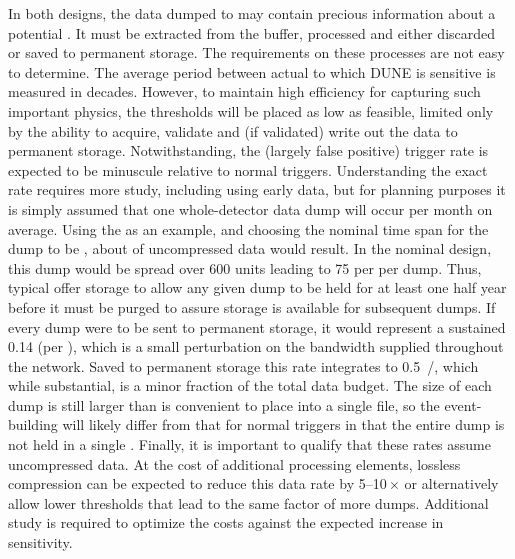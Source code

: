 In both designs, the data dumped to  may contain precious
information about a potential . 
It must be extracted from the buffer, processed and either discarded
or saved to permanent storage. 
The requirements on these processes are not easy to determine.
The average period between actual  to which DUNE is
sensitive is measured in decades. 
However, to maintain high efficiency for capturing such important
physics, the thresholds will be placed as low as feasible, limited
only by the ability to acquire, validate and (if validated) write out the
data to permanent storage. 
Notwithstanding, the (largely false positive)  trigger rate is
expected to be minuscule relative to normal triggers.
Understanding the exact rate requires more study, including using
early data, but for planning purposes it is simply assumed that one
whole-detector data dump will occur per month on average.
Using the  as an example, and choosing the
nominal time span for the dump to be \snbtime{}, about \spsnbsize of
uncompressed data would result.
In the nominal   design, this dump would be spread over
\num{600}  units leading to \SI{75}{\GB} per  per dump.
Thus, typical  offer storage to allow any given dump to be
held for at least one half year before it must be purged to assure
storage is available for subsequent dumps.
If every dump were to be sent to permanent storage, it would represent
a sustained \SI{0.14}{\Gbps} (per ), which is a small
perturbation on the bandwidth supplied throughout the  network. 
Saved to permanent storage this rate integrates to \SI{0.5}{\PB/\year}, 
which while substantial, is a minor fraction of the total data budget.
The size of each dump is still larger than is convenient to place into
a single file, so the  event-building will likely differ from
that for normal triggers in that the entire dump is not held in a
single . 
Finally, it is important to qualify that these rates assume
uncompressed data. 
At the cost of additional processing elements, lossless compression
can be expected to reduce this data rate by \numrange{5}{10}\,$\times$ or
alternatively allow lower thresholds that lead to the same factor of %
more
dumps.
Additional study is required to optimize the costs against the expected
increase in sensitivity.


